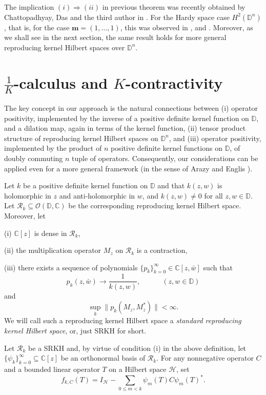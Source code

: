 \documentclass[12pt]{amsart}
\begin{document}
The implication $(i) {\Rightarrow} (ii)$ in previous theorem was recently
obtained by Chattopadhyay, Das and the third author in \cite{CDS}.
For the Hardy space case $H^2(\mathbb{D}^n)$, that is, for the case
${\bm{m}} = (1, \ldots, 1)$, this was observed in \cite{BNS}, \cite{INS} and 
\cite{S-JOT}. Moreover, as we shall see in the next section, the
same result holds for more general reproducing kernel Hilbert spaces
over ${\mathbb{D}}^n$.

{\setcounter{equation}{0} \section{{$\frac{1}{K}$-calculus and $K$-contractivity}}}\label{K}

The key concept in our approach is the natural connections between
(i) operator positivity, implemented by the inverse of a positive
definite kernel function on ${\mathbb{D}}$, and a dilation map, again in terms
of the kernel function, (ii) tensor product structure of reproducing
kernel Hilbert spaces on ${\mathbb{D}}^n$, and (iii) operator positivity,
implemented by the product of $n$ positive definite kernel functions
on ${\mathbb{D}}$, of doubly commuting $n$ tuple of operators. Consequently,
our considerations can be applied even for a more general framework (in the sense of Arazy and Englis \cite{AE}).

Let $k$ be a positive definite kernel function on $\mathbb{D}$ and
that $k(z, w)$ is holomorphic in $z$ and anti-holomorphic in $w$,
and $k(z, w) \neq 0$ for all $z, w \in {\mathbb{D}}$. Let ${\mathcal{R}}_k \subseteq
{\mathcal{O}}({\mathbb{D}}, {\mathbb{C}})$ be the corresponding reproducing kernel Hilbert space.
Moreover, let

(i) ${\mathbb{C}}[z]$ is dense in ${\mathcal{R}}_k$,

(ii) the multiplication operator $M_z$ on ${\mathcal{R}}_k$ is a contraction,

(iii) there exists a sequence of polynomials $\{p_k\}_{k=0}^\infty
\in {\mathbb{C}}[z, \bar{w}]$ such that
\[p_k(z, \bar{w}) \longrightarrow \frac{1}{k(z, {w})}, \quad \quad
\quad (z, w \in {\mathbb{D}})\]and\[\sup_{k} \|p_k(M_z, M_z^*)\| < \infty.\]
We will call such a reproducing kernel Hilbert space a
\textit{standard reproducing kernel Hilbert space}, or, just SRKH
for short.

Let ${\mathcal{R}}_k$ be a SRKH and, by virtue of condition (i) in the above
definition, let $\{\psi_k\}_{k=0}^\infty \subseteq {\mathbb{C}}[z]$ be an
orthonormal basis of ${\mathcal{R}}_k$. For any nonnegative operator $C$ and
a bounded linear operator $T$ on a Hilbert space ${\mathcal{H}}$, set
\[f_{k,C}(T) = I_{\mathcal{H}} - \sum_{0 \leq m < k} \psi_m(T) C
\psi_m(T)^*.\]
\end{document}
